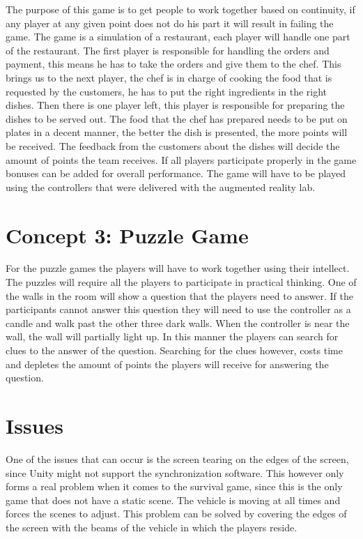 \documentclass[10pt,a4paper]{article}
\begin{document}
The purpose of this game is to get people to work together based on continuity, if any player at any given point does not do his part it will result in failing the game. The game is a simulation of a restaurant, each player will handle one part of the restaurant. The first player is responsible for handling the orders and payment, this means he has to take the orders and give them to the chef. This brings us to the next player, the chef is in charge of cooking the food that is requested by the customers, he has to put the right ingredients in the right dishes. Then there is one player left, this player is responsible for preparing the dishes to be served out. The food that the chef has prepared needs to be put on plates in a decent manner, the better the dish is presented, the more points will be received. The feedback from the customers about the dishes will decide the amount of points the team receives. If all players participate properly in the game bonuses can be added for overall performance. The game will have to be played using the controllers that were delivered with the augmented reality lab. 

\section{Concept 3: Puzzle Game}
For the puzzle games the players will have to work together using their intellect. The puzzles will require all the players to participate in practical thinking. One of the walls in the room will show a question that the players need to answer. If the participants cannot answer this question they will need to use the controller as a candle and walk past the other three dark walls. When the controller is near the wall, the wall will partially light up. In this manner the players can search for clues to the answer of the question. Searching for the clues however, costs time and depletes the amount of points the players will receive for answering the question.

\section{Issues}

One of the issues that can occur is the screen tearing on the edges of the screen, since Unity might not support the synchronization software. This however only forms a real problem when it comes to the survival game, since this is the only game that does not have a static scene. The vehicle is moving at all times and forces the scenes to adjust. This problem can be solved by covering the edges of the screen with the beams of the vehicle in which the players reside.
\end{document}

